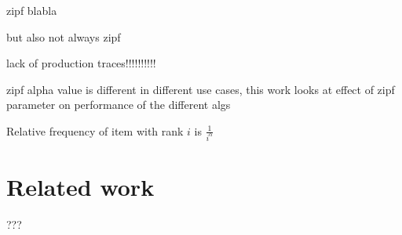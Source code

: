 zipf blabla

but also not always zipf

lack of production traces!!!!!!!!!!

zipf alpha value is different in different use cases, this work looks at effect of zipf parameter on performance of the different algs

Relative frequency of item with rank $i$ is  \(\frac{1}{i^\alpha}\)  

\section{Related work}

???
